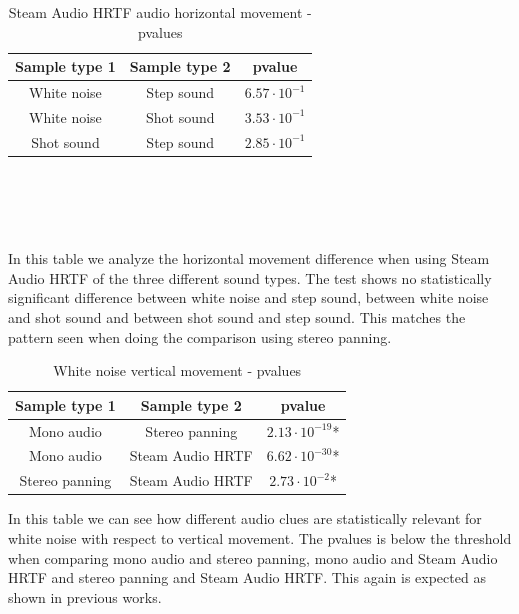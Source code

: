 \documentclass[conference]{IEEEtran}
\begin{document}
\begin{table}[htbp]
\caption{Steam Audio HRTF audio horizontal movement - pvalues}
\begin{center}
\begin{tabular}{|c|c|c|}
\hline
\textbf{Sample type 1} & \textbf{Sample type 2} & \textbf{pvalue}\\
\hline
White noise & Step sound & $6.57 \cdot 10^{-1}$\\
\hline
White noise & Shot sound & $3.53 \cdot 10^{-1}$\\
\hline
Shot sound & Step sound & $2.85 \cdot 10^{-1}$\\
\hline
\end{tabular}
\label{tab71}
\end{center}
\end{table}
\mbox{}\\\mbox{}\\\mbox{}\\\mbox{}\\
In this table we analyze the horizontal movement difference when using Steam Audio HRTF of the three different sound types. The test shows no statistically significant difference between white noise and step sound, between white noise and shot sound and between shot sound and step sound. This matches the pattern seen when doing the comparison using stereo panning.

\begin{table}[htbp]
\caption{White noise vertical movement - pvalues}
\begin{center}
\begin{tabular}{|c|c|c|}
\hline
\textbf{Sample type 1} & \textbf{Sample type 2} & \textbf{pvalue}\\
\hline
Mono audio & Stereo panning & $2.13 \cdot 10^{-19}$*\\
\hline
Mono audio & Steam Audio HRTF & $6.62 \cdot 10^{-30}$*\\
\hline
Stereo panning & Steam Audio HRTF & $2.73 \cdot 10^{-2}$*\\
\hline
\end{tabular}
\label{tab12}
\end{center}
\end{table}

In this table we can see how different audio clues are statistically relevant for white noise with respect to vertical movement. The pvalues is below the threshold when comparing mono audio and stereo panning, mono audio and Steam Audio HRTF and stereo panning and Steam Audio HRTF. This again is expected as shown in previous works.
\end{document}
